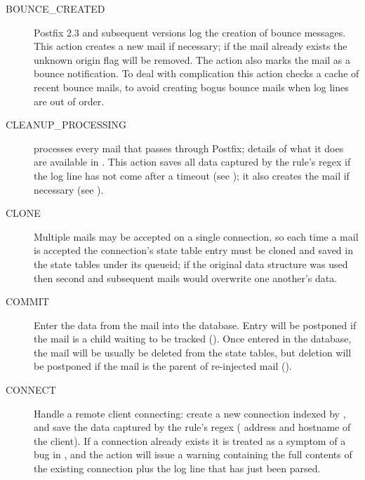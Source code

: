 \begin{description}

    \item [BOUNCE\_CREATED] Postfix 2.3 and subsequent versions log the
        creation of bounce messages.  This action creates a new mail if
        necessary; if the mail already exists the unknown origin flag will
        be removed.  The action also marks the mail as a bounce
        notification.  To deal with complication  this
        action checks a cache of recent bounce mails, to avoid creating
        bogus bounce mails when log lines are out of order.

    \item [CLEANUP\_PROCESSING]  processes every mail that
        passes through Postfix; details of what it does are available in
        .  This action saves all data captured
        by the rule's regex if the log line has not come after a timeout
        (see ); it also creates
        the mail if necessary (see ).

    \item [CLONE] Multiple mails may be accepted on a single connection, so
        each time a mail is accepted the connection's state table entry
        must be cloned and saved in the state tables under its queueid; if
        the original data structure was used then second and subsequent
        mails would overwrite one another's data.

    \item [COMMIT] Enter the data from the mail into the database.  Entry
        will be postponed if the mail is a child waiting to be tracked
        ().  Once entered in the database,
        the mail will be usually be deleted from the state tables, but
        deletion will be postponed if the mail is the parent of re-injected
        mail ().

    \item [CONNECT] Handle a remote client connecting: create a new
        connection indexed by  , and save the
        data captured by the rule's regex ( address and
        hostname of the client).  If a connection already exists it is
        treated as a symptom of a bug in \parsername{}, and the action will
        issue a warning containing the full contents of the existing
        connection plus the log line that has just been parsed.


\end{description}
